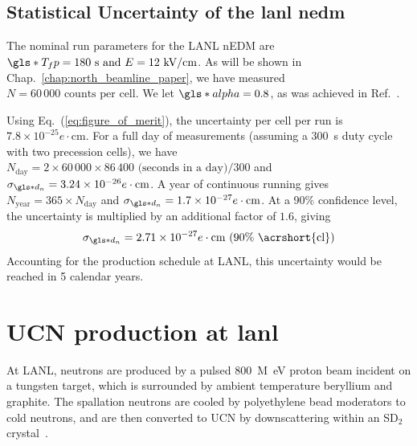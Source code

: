 
\subsection
{
    \texorpdfstring{Statistical Uncertainty of the \acrshort{lanl} \acrshort{nedm}}
                    {Statistical Uncertainty of the LANL nEDM}\label{sec:lanl_nedm_uncertainty}
}


The nominal run parameters for the LANL nEDM are $\gls*{T_fp}=180\text{ s and } E=12\text{ kV/cm}$. As will be shown in Chap.~\ref{chap:north_beamline_paper}, we have measured $N=60\,000\text{ counts per cell}$. We let $\gls*{alpha}=0.8$, as was achieved in Ref.~\cite{ABE20}.

Using Eq.~(\ref{eq:figure_of_merit}), the uncertainty per cell per run is $7.8 \times 10^{-25}e\cdot\text{cm}$. For a full day of measurements (assuming a \qty{300}{\s} duty cycle with two precession cells), we have $N_\text{day}=2\times60\,000\times86\,400\text{ (seconds in a day)}/300$ and $\sigma_{\gls*{d_n}}=3.24\times10^{-26}e\cdot\text{cm}$. A year of continuous running gives $N_\text{year}=365\times N_\text{day}$ and $\sigma_{\gls*{d_n}}=1.7\times10^{-27}e\cdot\text{cm}$. At a 90\% confidence level, the uncertainty is multiplied by an additional factor of $1.6$, giving
%
\begin{gather}
    \sigma_{\gls*{d_n}}=2.71\times10^{-27}e\cdot\text{cm (90\% \acrshort{cl})}
\end{gather}
%
Accounting for the production schedule at LANL, this uncertainty would be reached in 5 calendar years.


\section
{
    \texorpdfstring{UCN production at \acrshort{lanl}}
                   {UCN production at LANL}
}\label{sec:lanl_ucn_source}


At LANL, neutrons are produced by a pulsed \qty{800}{M\eV} proton beam incident on a tungsten target, which is surrounded by ambient temperature beryllium and graphite. The spallation neutrons are cooled by polyethylene bead moderators to cold neutrons, and are then converted to UCN by downscattering within an SD$_2$ crystal~\cite{saunders_performance_2013}.


